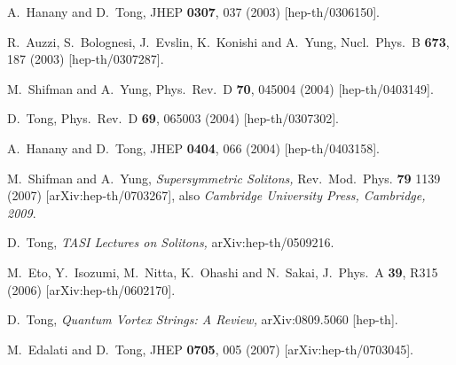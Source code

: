 \documentclass[12pt]{article}
\begin{document}
%
%
\small
\begin{thebibliography}{99}
\itemsep -2pt


A.~Hanany and D.~Tong,
JHEP {\bf 0307}, 037 (2003)
[hep-th/0306150].

R.~Auzzi, S.~Bolognesi, J.~Evslin, K.~Konishi and A.~Yung,
Nucl.\ Phys.\ B {\bf 673}, 187 (2003)
[hep-th/0307287].

M.~Shifman and A.~Yung,
Phys.\ Rev.\ D {\bf 70}, 045004 (2004)
[hep-th/0403149].

D.~Tong,
Phys.\ Rev.\ D {\bf 69}, 065003 (2004)
[hep-th/0307302].

A.~Hanany and D.~Tong,
JHEP {\bf 0404}, 066 (2004)
[hep-th/0403158].

M.~Shifman and A.~Yung,
{\sl Supersymmetric Solitons,}
Rev.\ Mod.\ Phys. {\bf 79} 1139 (2007)
[arXiv:hep-th/0703267], also {\sl Cambridge University Press, Cambridge, 2009}.

D.~Tong,
{\em TASI Lectures on Solitons,}
  arXiv:hep-th/0509216.
 
  M.~Eto, Y.~Isozumi, M.~Nitta, K.~Ohashi and N.~Sakai,
  J.\ Phys.\ A  {\bf 39}, R315 (2006)
  [arXiv:hep-th/0602170].
   
D.~Tong,
{\em Quantum Vortex Strings: A Review,}
  arXiv:0809.5060 [hep-th].
  
  M.~Edalati and D.~Tong,
  JHEP {\bf 0705}, 005 (2007)
  [arXiv:hep-th/0703045].


\end{thebibliography}
\end{document}
